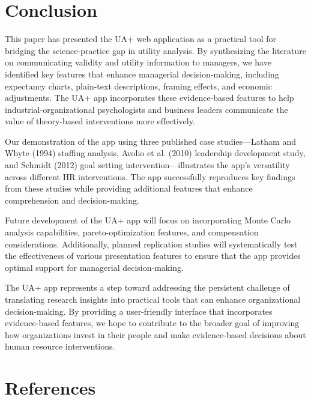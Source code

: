 \documentclass[
  english,
  man]{apa6}
\begin{document}
\section{Conclusion}\label{conclusion}

This paper has presented the UA+ web application as a practical tool for bridging the science-practice gap in utility analysis. By synthesizing the literature on communicating validity and utility information to managers, we have identified key features that enhance managerial decision-making, including expectancy charts, plain-text descriptions, framing effects, and economic adjustments. The UA+ app incorporates these evidence-based features to help industrial-organizational psychologists and business leaders communicate the value of theory-based interventions more effectively.

Our demonstration of the app using three published case studies---Latham and Whyte (1994) staffing analysis, Avolio et al. (2010) leadership development study, and Schmidt (2012) goal setting intervention---illustrates the app's versatility across different HR interventions. The app successfully reproduces key findings from these studies while providing additional features that enhance comprehension and decision-making.

Future development of the UA+ app will focus on incorporating Monte Carlo analysis capabilities, pareto-optimization features, and compensation considerations. Additionally, planned replication studies will systematically test the effectiveness of various presentation features to ensure that the app provides optimal support for managerial decision-making.

The UA+ app represents a step toward addressing the persistent challenge of translating research insights into practical tools that can enhance organizational decision-making. By providing a user-friendly interface that incorporates evidence-based features, we hope to contribute to the broader goal of improving how organizations invest in their people and make evidence-based decisions about human resource interventions.

\newpage

\section{References}\label{references}
\end{document}
